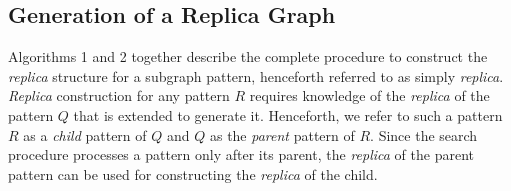 \subsection{Generation of a Replica Graph}
\label{subsubsec:replica-gen}
Algorithms 1 and 2 together describe the complete procedure to construct the
\emph{replica} structure for a subgraph pattern, henceforth referred to as
simply \emph{replica}. \emph{Replica} construction for any pattern $R$ requires
knowledge of the \emph{replica} of the pattern $Q$ that is extended to generate
it. Henceforth, we refer to such a pattern $R$ as a \textit{child} pattern of
$Q$ and $Q$ as the \textit{parent} pattern of $R$. Since the search procedure
processes a pattern only after its parent, the \emph{replica} of the
parent pattern can be used for constructing the \emph{replica} of the
child.

